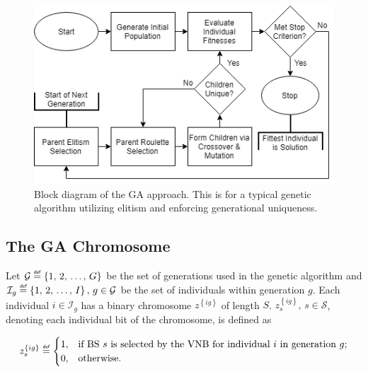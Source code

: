 \documentclass[12pt,dvipsnames]{report}
\newif\ifisdoublespacing
\newcommand\defeq{\mathrel{\overset{\makebox[0pt]{\mbox{\normalfont\tiny\sffamily def}}}{=}}}
\begin{document}
\begin{figure}[!ht]
\centering
\includegraphics[width=1\linewidth]{Genetic_Algorithm_Basic}
\caption[Genetic Algorithm Block Diagram]{\small Block diagram of the GA approach.  This is for a typical genetic algorithm utilizing elitism and enforcing generational uniqueness.}
\label{fig:ga_block}
\end{figure}

\subsection{The GA Chromosome} \label{subsec:ga_chromosome}

Let $\mathcal{G} \defeq \left\{ 1,\, 2,\, \ldots,\, G \right\}$ be the set of generations used in the genetic algorithm and $\mathcal{I}_g \defeq \left\{ 1,\, 2,\, \ldots,\, I \right\},\, g \in \mathcal{G}$ be the set of individuals within generation $g$.  Each individual $i \in \mathcal{I}_g$ has a binary chromosome $z^{\left\{ ig \right\}}$ of length $S$.  $z_s^{\left\{ ig \right\}},\, s \in \mathcal{S}$, denoting each individual bit of the chromosome, is defined as

\ifisdoublespacing
\begin{singlespacing}
\begin{equation}
z_s^{\left\{ ig \right\}} \defeq
	\begin{cases}
		1,& \text{if BS $s$ is selected by the VNB for individual $i$ in generation $g$;}\\
		\\
		0,& \text{otherwise.}
	\end{cases}
\end{equation}
\end{singlespacing}
\else
\begin{equation}
z_s^{\left\{ ig \right\}} \defeq
	\begin{cases}
		1,& \text{if BS $s$ is selected by the VNB for individual $i$ in generation $g$;}\\
		0,& \text{otherwise.}
	\end{cases}
\end{equation}
\fi
\end{document}
